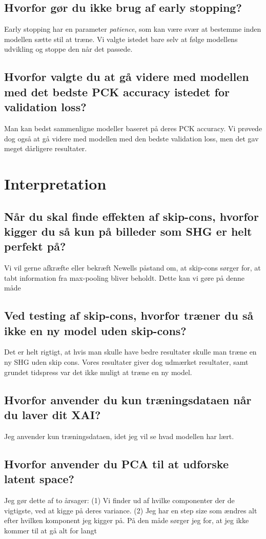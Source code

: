 \documentclass[a4paper]{article}
\begin{document}
\subsection{Hvorfor gør du ikke brug af early stopping?}
Early stopping har en parameter \textit{patience}, som kan være svær at bestemme inden modellen sætte stil at træne. Vi valgte istedet bare selv at følge modellens udvikling og stoppe den når det passede.

\subsection{Hvorfor valgte du at gå videre med modellen med det bedste PCK accuracy istedet for validation loss?}
Man kan bedst sammenligne modeller baseret på deres PCK accuracy. Vi prøvede dog også at gå videre med modellen med den bedste validation loss, men det gav meget dårligere resultater.

\section{Interpretation}
\subsection{Når du skal finde effekten af skip-cons, hvorfor kigger du så kun på billeder som SHG er helt perfekt på?}
Vi vil gerne afkræfte eller bekræft Newells påstand om, at skip-cons sørger for, at tabt information fra max-pooling bliver beholdt. Dette kan vi gøre på denne måde

\subsection{Ved testing af skip-cons, hvorfor træner du så ikke en ny model uden skip-cons?}
Det er helt rigtigt, at hvis man skulle have bedre resultater skulle man træne en ny SHG uden skip cons. Vores resultater giver dog udmærket resultater, samt grundet tidspress var det ikke muligt at træne en ny model.

\subsection{Hvorfor anvender du kun træningsdataen når du laver dit XAI?}
Jeg anvender kun træningsdataen, idet jeg vil se hvad modellen har lært.

\subsection{Hvorfor anvender du PCA til at udforske latent space?}
Jeg gør dette af to årsager: (1) Vi finder ud af hvilke componenter der de vigtigste, ved at kigge på deres variance. (2) Jeg har en step size som ændres alt efter hvilken komponent jeg kigger på. På den måde sørger jeg for, at jeg ikke kommer til at gå alt for langt
\end{document}
